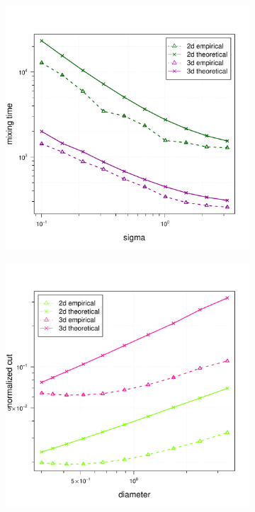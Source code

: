 \documentclass{article}
\newcommand{\1}{\mathbf{1}}
\theoremstyle{aldenthm}
\theoremstyle{aldenrmrk}
\begin{document}
\begin{figure}
\begin{adjustbox}{minipage=\linewidth,scale=0.8}
		
		\begin{subfigure}{.33\linewidth}
			\includegraphics[width=\linewidth]{example1plots/sigma_mixing_time_plot}
			\caption{}
		\end{subfigure}
		\begin{subfigure}{.33\linewidth}
			\includegraphics[width=\linewidth]{example1plots/diameter_normalized_cut_plot}

\end{subfigure}
\end{adjustbox}
\end{figure}
\end{document}
